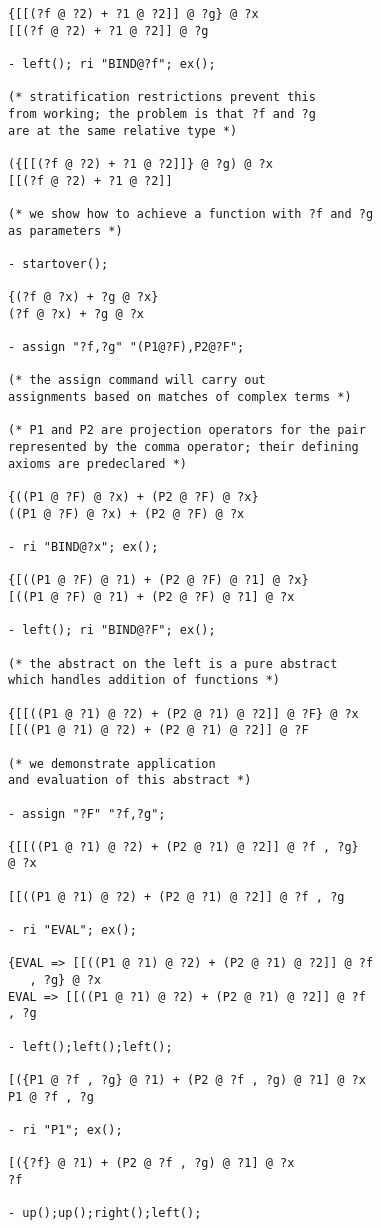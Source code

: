 \documentclass{kluwer}
\begin{document}
\begin{article}
\begin{verbatim}
{[[(?f @ ?2) + ?1 @ ?2]] @ ?g} @ ?x
[[(?f @ ?2) + ?1 @ ?2]] @ ?g

- left(); ri "BIND@?f"; ex();

(* stratification restrictions prevent this 
from working; the problem is that ?f and ?g 
are at the same relative type *)

({[[(?f @ ?2) + ?1 @ ?2]]} @ ?g) @ ?x
[[(?f @ ?2) + ?1 @ ?2]]

(* we show how to achieve a function with ?f and ?g
as parameters *)

- startover();

{(?f @ ?x) + ?g @ ?x}
(?f @ ?x) + ?g @ ?x

- assign "?f,?g" "(P1@?F),P2@?F";

(* the assign command will carry out 
assignments based on matches of complex terms *)

(* P1 and P2 are projection operators for the pair 
represented by the comma operator; their defining 
axioms are predeclared *)

{((P1 @ ?F) @ ?x) + (P2 @ ?F) @ ?x}
((P1 @ ?F) @ ?x) + (P2 @ ?F) @ ?x

- ri "BIND@?x"; ex();

{[((P1 @ ?F) @ ?1) + (P2 @ ?F) @ ?1] @ ?x}
[((P1 @ ?F) @ ?1) + (P2 @ ?F) @ ?1] @ ?x

- left(); ri "BIND@?F"; ex();

(* the abstract on the left is a pure abstract 
which handles addition of functions *)

{[[((P1 @ ?1) @ ?2) + (P2 @ ?1) @ ?2]] @ ?F} @ ?x
[[((P1 @ ?1) @ ?2) + (P2 @ ?1) @ ?2]] @ ?F

(* we demonstrate application 
and evaluation of this abstract *)

- assign "?F" "?f,?g";

{[[((P1 @ ?1) @ ?2) + (P2 @ ?1) @ ?2]] @ ?f , ?g} 
@ ?x

[[((P1 @ ?1) @ ?2) + (P2 @ ?1) @ ?2]] @ ?f , ?g

- ri "EVAL"; ex();

{EVAL => [[((P1 @ ?1) @ ?2) + (P2 @ ?1) @ ?2]] @ ?f 
   , ?g} @ ?x
EVAL => [[((P1 @ ?1) @ ?2) + (P2 @ ?1) @ ?2]] @ ?f 
, ?g

- left();left();left();

[({P1 @ ?f , ?g} @ ?1) + (P2 @ ?f , ?g) @ ?1] @ ?x
P1 @ ?f , ?g

- ri "P1"; ex();

[({?f} @ ?1) + (P2 @ ?f , ?g) @ ?1] @ ?x
?f

- up();up();right();left();


\end{verbatim}
\end{article}
\end{document}
